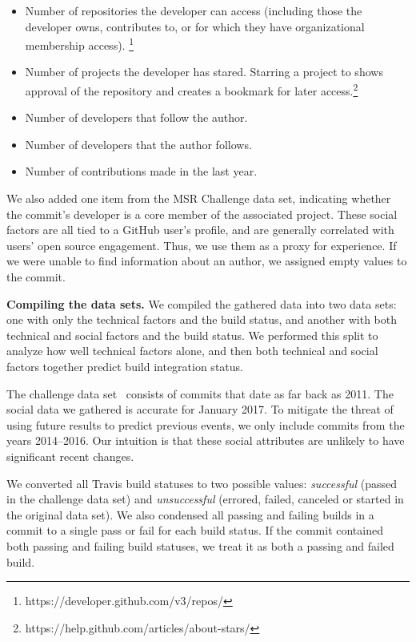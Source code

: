 \documentclass[10pt, conference]{IEEEtran}
\begin{document}
\begin{itemize}
	\item Number of repositories the developer can access (including those
the developer owns, contributes to, or for which they have
organizational membership access).%
\footnote{https://developer.github.com/v3/repos/}
\item  Number of projects the developer has stared. Starring a project
to shows approval of the repository and creates a bookmark for later 
access.\footnote{https://help.github.com/articles/about-stars/}
\item Number of developers that follow the author. 
\item Number of developers that the author follows.
\item Number of contributions made in the last year.
\end{itemize}

We also added one item from the MSR Challenge data set, indicating
whether the commit's developer is a core member  
of the associated project.
These social factors are all tied to a GitHub user's profile,
and are generally correlated with users' open source engagement.
Thus, we use them as a proxy for
experience.  If we were unable to find information about an author, we
assigned empty values to the commit.

\vspace{1ex}
\noindent\textbf{Compiling the data sets.} We compiled the gathered data into 
two data sets: one with only the technical
factors and the build status, and another with both technical and social
factors and the build status. We performed this split to analyze how well 
technical factors alone,
and then both technical and social
factors together predict build integration status.

The challenge data set~\cite{msr17challenge} consists
of commits that date as far back as 2011. The social data we 
gathered is accurate for January 2017. To mitigate the threat of
using future results to predict previous events,
we only include commits from the years 2014--2016.  Our intuition is
that these social attributes are unlikely to have significant recent changes.

We converted all Travis build statuses to two possible values:
\emph{successful} (passed in the challenge data set) and \emph{unsuccessful}
(errored, failed, canceled
or started in the original data set). We also condensed all passing and
failing builds in a commit to a single pass or fail for each build status.  If
the commit contained both passing and failing build statuses, we treat it as
both a passing and failed build. 
\end{document}
